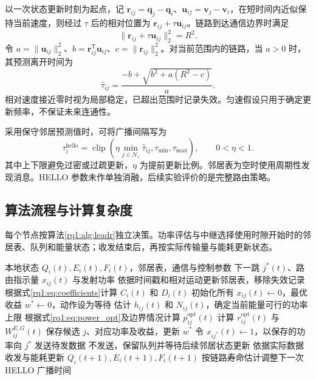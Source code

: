 以一次状态更新时刻为起点，记 $\bm r_{ij}=\bm q_j-\bm q_i$、$\bm u_{ij}=\bm v_j-\bm v_i$，在短时间内近似保持当前速度，则经过 $\tau$ 后的相对位置为 $\bm r_{ij}+\tau\bm u_{ij}$。链路到达通信边界时满足
\begin{equation}
 \|\bm r_{ij}+\tau\bm u_{ij}\|_2^2=R^2.
 \label{rq1:eq:let_equation}
\end{equation}
令 $a=\|\bm u_{ij}\|_2^2$、$b=\bm r_{ij}^{\mathsf T}\bm u_{ij}$、$c=\|\bm r_{ij}\|_2^2$。对当前范围内的链路，当 $a>0$ 时，其预测离开时间为
\begin{equation}
 \widehat\tau_{ij}=
 \frac{-b+\sqrt{b^2+a(R^2-c)}}{a}.
 \label{rq1:eq:let_solution}
\end{equation}
相对速度接近零时视为局部稳定，已超出范围时记录失效。匀速假设只用于确定更新频率，不保证未来连通性。

采用保守邻居预测值时，可将广播间隔写为
\begin{equation}
 \tau_i^{\mathrm{hello}}=
 \operatorname{clip}\!\left(\eta\min_{j\in\mathcal{N}_i}\widehat\tau_{ij},
                          \tau_{\min},\tau_{\max}\right),\qquad 0<\eta<1.
 \label{rq1:eq:hello_interval}
\end{equation}
其中上下限避免过密或过疏更新，$\eta$ 为提前更新比例。邻居表为空时使用周期性发现消息。HELLO 参数未作单独消融，后续实验评价的是完整路由策略。

\subsection{算法流程与计算复杂度}

每个节点按算法\ref{rq1:alg:leadr}独立决策。功率评估与中继选择使用时隙开始时的邻居表、队列和能量状态；收发结束后，再按实际传输量与能耗更新状态。

\begin{algorithm}[!htbp]
\caption{LEADR 分布式路由与功率联合决策\\\small LEADR decentralized routing and power control}
\label{rq1:alg:leadr}
\small
\begin{algorithmic}[1]
\Require 本地状态 $Q_i(t),E_i(t),F_i(t)$，邻居表，通信与控制参数
\Ensure 下一跳 $j^*(t)$、路由指示量 $x_{ij}(t)$ 与发射功率
\State 依据时间戳和相对运动更新邻居表，移除失效记录
\State 根据式\eqref{rq1:eq:coefficients}计算 $C_i(t)$ 和 $D_i(t)$
\State 初始化所有 $x_{ij}(t)\gets0$，最优收益 $w^*\gets0$，动作设为等待
   \State 估计 $h_{ij}(t)$ 和 $N_{ij}(t)$，确定当前能量可行的功率上限
   \State 根据式\eqref{rq1:eq:power_opt}及边界情况计算 $p_{ij}^{\mathrm{opt}}(t)$
   \State 计算 $r_{ij}^{\mathrm{opt}}(t)$ 与 $W_{ij}^{E,G}(t)$
    \State 保存候选 $j$、对应功率及收益，更新 $w^*$
   \EndIf
  \EndIf
 \EndFor
\EndIf
{}
 \State 令 $x_{ij^*}(t)\gets1$，以保存的功率向 $j^*$ 发送待发数据
\Else
 \State 不发送，保留队列并等待后续邻居状态更新
\EndIf
\State 依据实际数据收发与能耗更新 $Q_i(t+1),E_i(t+1),F_i(t+1)$
\State 按链路寿命估计调整下一次 HELLO 广播时间
\end{algorithmic}
\end{algorithm}

